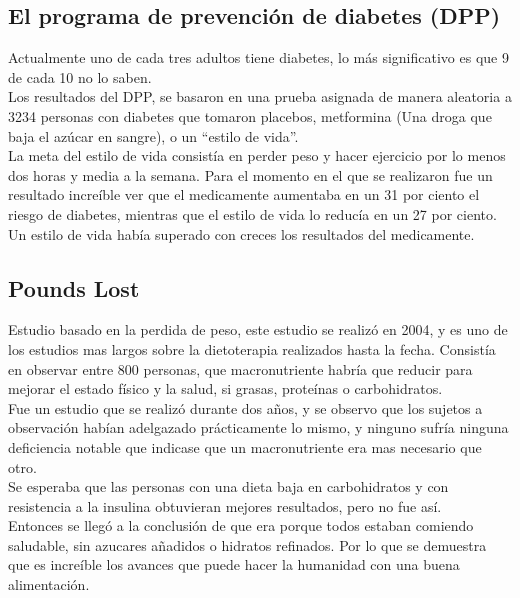 \subsection{El programa de prevención de diabetes (DPP)}
Actualmente uno de cada tres adultos tiene diabetes, lo más significativo es que 9 de cada 10 no lo saben. \\

Los resultados del DPP, se basaron en una prueba asignada de manera aleatoria a 3234 personas con diabetes que tomaron placebos,  metformina (Una droga que baja el azúcar en sangre), o un “estilo de vida”.\\

La meta del estilo de vida consistía en perder peso y hacer ejercicio por lo menos dos horas y media a la semana.
Para el momento en el que se realizaron fue un resultado increíble ver que el medicamente aumentaba en un 31 por ciento el riesgo de diabetes, mientras que el estilo de vida lo reducía en un 27 por ciento. Un estilo de vida había superado con creces los resultados del medicamente. \\

\subsection{Pounds Lost}
Estudio basado en la perdida de peso, este estudio se realizó en 2004, y es uno de los estudios mas largos sobre la dietoterapia realizados hasta la fecha. Consistía en observar entre 800 personas, que macronutriente habría que reducir para mejorar el estado físico y la salud, si grasas, proteínas o carbohidratos.\\

Fue un estudio que se realizó durante dos años, y se observo que los sujetos a observación habían adelgazado prácticamente lo mismo, y ninguno sufría ninguna deficiencia notable que indicase que un macronutriente era mas necesario que otro.\\

Se esperaba que las personas con una dieta baja en carbohidratos y con resistencia a la insulina obtuvieran mejores resultados, pero no fue así.\\
Entonces se llegó a la conclusión de que era porque todos estaban comiendo saludable, sin azucares añadidos o hidratos refinados. Por lo que se demuestra que es increíble los avances que puede hacer la humanidad con una buena alimentación.
